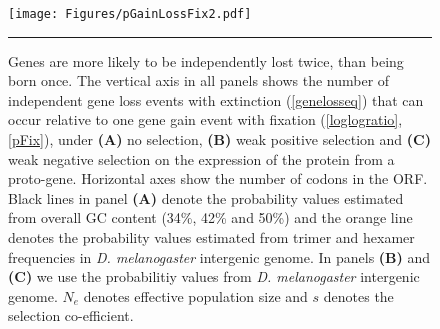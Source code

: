 \documentclass[12pt,a4paper]{article}
\begin{document}
\begin{figure}[!t]
\centering
\texttt{[image: Figures/pGainLossFix2.pdf]}
\caption{Genes are more likely to be independently lost twice, than being born once. The vertical axis in all panels shows the number of independent gene loss events with extinction (\autoref{genelosseq}) that can occur relative to one gene gain event with fixation (\autoref{loglogratio}, \autoref{pFix}), under \textbf{(A)} no selection, \textbf{(B)} weak positive selection and \textbf{(C)} weak negative selection on the expression of the protein from a proto-gene. Horizontal axes show the number of codons in the ORF. Black lines in panel \textbf{(A)} denote the probability values estimated from overall GC content (34\%, 42\% and 50\%) and the orange line denotes the probability values estimated from trimer and hexamer frequencies in \textit{D. melanogaster} intergenic genome. In panels \textbf{(B)} and \textbf{(C)} we use the probabilitiy values from \textit{D. melanogaster} intergenic genome. $N_e$ denotes effective population size and $s$ denotes the selection co-efficient.}
\label{gainlossprob}
\vspace{1ex}
\hrule
\end{figure}
\end{document}
